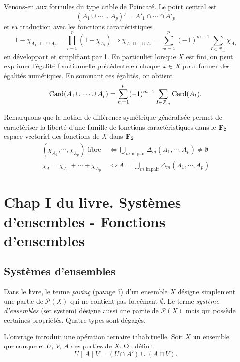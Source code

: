 \noindent Venons-en aux formules du type crible de Poincaré. Le point central est 
\begin{displaymath}
  (A_1 \cup \cdots \cup A_p)' = A'_1 \cap \cdots \cap A'_p
\end{displaymath}
et sa traduction avec les fonctions caractéristiques
\begin{displaymath}
  1 - \chi_{A_1 \cup \cdots \cup A_p} = \prod_{i=1}^p(1 - \chi_{A_i})
  \Rightarrow
  \chi_{A_1 \cup \cdots \cup A_p} = \sum_{m=1}^p (-1)^{m+1}\sum_{I \in \mathcal{P}_m}\chi_{A_I} 
\end{displaymath}
en développant et simplifiant par 1.\newline
En particulier lorsque $X$ est fini, on peut exprimer l'égalité fonctionnelle précédente en chaque $x\in X$ pour former des égalités numériques. En sommant ces égalités, on obtient
\begin{displaymath}
  \mathop{\mathrm{Card}}(A_1 \cup \cdots \cup A_p) = \sum_{m=1}^p (-1)^{m+1}\sum_{I \in \mathcal{P}_m}\mathop{\mathrm{Card}}(A_I).
\end{displaymath}


\noindent Remarquons que la notion de différence symétrique généralisée permet de caractériser la liberté d'une famille de fonctions caractéristiques dans le $\mathbf{F}_2$ espace vectoriel des fonctions de $X$ dans $\mathbf{F}_2$.
\begin{align*}
  (\chi_{A_1}, \cdots, \chi_{A_p}) \text{ libre } &\Leftrightarrow \bigcup_{m \text{ impair}} \Delta_m(A_1, \cdots, A_p) \not = \emptyset \\
  \chi_A = \chi_{A_1} + \cdots + \chi_{A_p} &\Leftrightarrow A = \bigcup_{m \text{ impair}} \Delta_m(A_1, \cdots, A_p)
\end{align*}


\section{Chap I du livre. Systèmes d'ensembles - Fonctions d'ensembles}
\subsection{Systèmes d'ensembles}
Dans le livre, le terme \emph{paving} (pavage ?) d'un ensemble $X$ désigne simplement une partie de $\mathcal{P}(X)$ qui ne contient pas forcément $\emptyset$. Le terme \emph{système d'ensembles} (set system) désigne aussi une partie de $\mathcal{P}(X)$ mais qui possède certaines propriétés. Quatre types sont dégagés.

L'ouvrage introduit une opération ternaire inhabituelle.\newline
Soit $X$ un ensemble quelconque et $U$, $V$, $A$ des parties de $X$. On définit
\begin{displaymath}
  U \mid A \mid V = (U \cap A') \cup ( A \cap V).
\end{displaymath}

